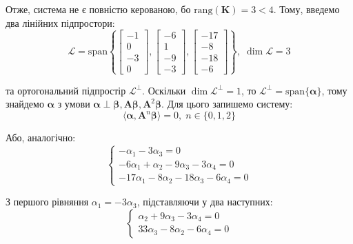 \documentclass[oneside,solution]{karazin-control-assign}
\begin{document}
Отже, система не є повністю керованою, бо $\text{rang}(\boldsymbol{K}) = 3 < 4$. Тому, введемо два лінійних підпростори:
\begin{equation}
    \mathcal{L} = \text{span}\left\{ \begin{bmatrix}
        -1 \\ 0 \\ -3 \\ 0
    \end{bmatrix},\begin{bmatrix}
        -6 \\ 1 \\ -9 \\ -3
    \end{bmatrix},\begin{bmatrix}
        -17 \\ -8 \\ -18 \\ -6
    \end{bmatrix}\right\}, \; \dim \mathcal{L} = 3
\end{equation}

та ортогональний підпростір $\mathcal{L}^{\perp}$. Оскільки $\dim \mathcal{L}^{\perp} = 1$, то $\mathcal{L}^{\perp} = \text{span} \{\boldsymbol{\alpha}\}$, тому знайдемо $\boldsymbol{\alpha}$ з умови $\boldsymbol{\alpha} \perp \boldsymbol{\beta},\boldsymbol{A\beta},\boldsymbol{A}^2\boldsymbol{\beta}$. Для цього запишемо систему:
\begin{equation}
    \langle \boldsymbol{\alpha}, \boldsymbol{A}^n\boldsymbol{\beta} \rangle = 0, \; n \in \{0,1,2\}
\end{equation}

Або, аналогічно:
\begin{equation}
    \begin{cases}
        -\alpha_1 - 3\alpha_3 = 0 \\
        -6\alpha_1 + \alpha_2 - 9\alpha_3 - 3\alpha_4 = 0 \\
        -17\alpha_1 - 8\alpha_2 - 18\alpha_3 - 6\alpha_4=0
    \end{cases}
\end{equation}

З першого рівняння $\alpha_1=-3\alpha_3$, підставляючи у два наступних:
\begin{equation}
    \begin{cases}
        \alpha_2 + 9\alpha_3 - 3\alpha_4 = 0 \\
        33\alpha_3 - 8\alpha_2 - 6\alpha_4 = 0
    \end{cases}
\end{equation}
\end{document}

